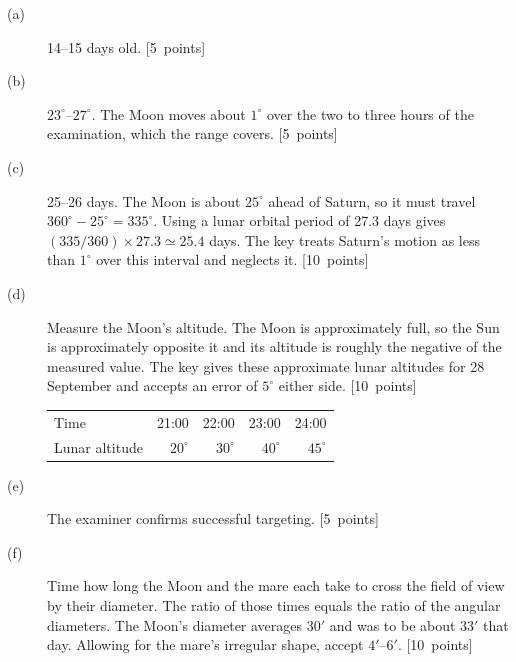 \begin{description}
\item[(a)] 14--15 days old. \hfill\mbox{[5 points]}
\item[(b)] \(23^\circ\)--\(27^\circ\). The Moon moves about \(1^\circ\) over the
two to three hours of the examination, which the range covers. \hfill\mbox{[5 points]}
\item[(c)] 25--26 days. The Moon is about \(25^\circ\) ahead of Saturn, so it
must travel \(360^\circ-25^\circ=335^\circ\). Using a lunar orbital period of
27.3 days gives \((335/360)\times27.3\simeq25.4\) days. The key treats Saturn's
motion as less than \(1^\circ\) over this interval and neglects it.
\hfill\mbox{[10 points]}
\item[(d)] Measure the Moon's altitude. The Moon is approximately full, so the
Sun is approximately opposite it and its altitude is roughly the negative
of the measured value. The key gives these approximate lunar altitudes for
28 September and accepts an error of \(5^\circ\) either side.
\hfill\mbox{[10 points]}

\begin{center}
\begin{tabular}{@{}lrrrr@{}}
\toprule
Time & 21:00 & 22:00 & 23:00 & 24:00\\
Lunar altitude & \(20^\circ\) & \(30^\circ\) & \(40^\circ\) & \(45^\circ\)\\
\bottomrule
\end{tabular}
\end{center}

\item[(e)] The examiner confirms successful targeting. \hfill\mbox{[5 points]}
\item[(f)] Time how long the Moon and the mare each take to cross the field
of view by their diameter. The ratio of those times equals the ratio of the
angular diameters. The Moon's diameter averages \(30'\) and was to be about
\(33'\) that day. Allowing for the mare's irregular shape, accept \(4'\)--\(6'\).
\hfill\mbox{[10 points]}
\end{description}
